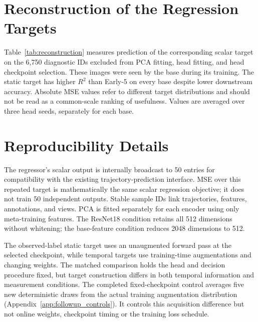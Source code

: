 \section{Reconstruction of the Regression Targets}
Table~\ref{tab:reconstruction} measures prediction of the corresponding scalar target on the 6,750 diagnostic IDs excluded from PCA fitting, head fitting, and head checkpoint selection. These images were seen by the base during its training. The static target has higher $R^2$ than Early-5 on every base despite lower downstream accuracy. Absolute MSE values refer to different target distributions and should not be read as a common-scale ranking of usefulness. Values are averaged over three head seeds, separately for each base.
\begin{table}[!ht]
\centering\small
\caption{Diagnostic-held-out target reconstruction using base features. $R^2$ is relative to each target's own variance; it is not error-detection AUROC.}
\label{tab:reconstruction}

\end{table}

\section{Reproducibility Details}
The regressor's scalar output is internally broadcast to 50 entries for compatibility with the existing trajectory-prediction interface. MSE over this repeated target is mathematically the same scalar regression objective; it does not train 50 independent outputs. Stable sample IDs link trajectories, features, annotations, and views. PCA is fitted separately for each encoder using only meta-training features. The ResNet18 condition retains all 512 dimensions without whitening; the base-feature condition reduces 2048 dimensions to 512.

The observed-label static target uses an unaugmented forward pass at the selected checkpoint, while temporal targets use training-time augmentations and changing weights. The matched comparison holds the head and decision procedure fixed, but target construction differs in both temporal information and measurement conditions. The completed fixed-checkpoint control averages five new deterministic draws from the actual training augmentation distribution (Appendix~\ref{app:followup_controls}). It controls this acquisition difference but not online weights, checkpoint timing or the training loss schedule.

